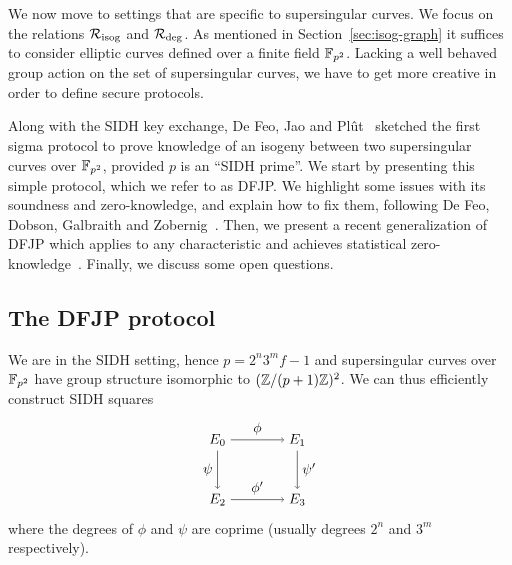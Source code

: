 

We now move to settings that are specific to supersingular curves.
We focus on the relations $\R[isog]$ and $\R[deg]$.
As mentioned in Section~\ref{sec:isog-graph} it suffices to consider elliptic curves defined over a finite field $\F_{p^2}$.
Lacking a well behaved group action on the set of supersingular curves, we have to get more creative in order to define secure protocols.

Along with the SIDH key exchange, De Feo, Jao and Pl\^{u}t~\cite{DFJP14} sketched the first sigma protocol to prove knowledge of an isogeny between two supersingular curves over $\F_{p^2}$, provided $p$ is an ``SIDH prime''.
We start by presenting this simple protocol, which we refer to as DFJP.
We highlight some issues with its soundness and zero-knowledge, and explain how to fix them, following De Feo, Dobson, Galbraith and Zobernig~\cite{DFDGZ21}.
Then, we present a recent generalization of DFJP which applies to any characteristic and achieves statistical zero-knowledge~\cite{cryptoeprint:2022/1469}.
Finally, we discuss some open questions.


\subsection{The DFJP protocol}\label{sec:DFJP}

We are in the SIDH setting, hence $p = 2^n 3^m f - 1$ and supersingular curves over $\F_{p^2}$ have group structure isomorphic to $(\Z/(p+1)\Z)^2$.
We can thus efficiently construct SIDH squares
%
\begin{equation}
    \label{eq:sidh-pok}
    \tikz[x=2cm,y=-1.5cm,baseline=-.75cm]{
    \node (E0) at (0,0) {$E_0$};
    \node (E1) at (1,0) {$E_1$};
    \node (E2) at (0,1) {$E_2$};
    \node (E3) at (1,1) {$E_3$};
    \draw[->] (E0) edge node[above] {$\phi$} (E1)
    (E0) edge node[left] {$\psi$} (E2)
    (E1) edge node[right] {$\psi'$} (E3)
    (E2) edge node[above] {$\phi'$} (E3);
    }
\end{equation}
%
where the degrees of $\phi$ and $\psi$ are coprime (usually degrees $2^n$ and $3^m$ respectively).

